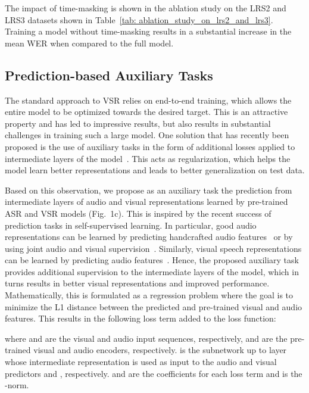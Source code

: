 \documentclass[twocolumn]{article}
\begin{document}
The impact of time-masking is shown in the ablation study on the LRS2 and LRS3 datasets shown in Table~\ref{tab: ablation_study_on_lrs2_and_lrs3}. Training a model without time-masking results in a substantial increase in the mean WER when compared to the full model.

\subsection{Prediction-based Auxiliary Tasks}
The standard approach to VSR relies on end-to-end training, which allows the entire model to be optimized towards the desired target. This is an attractive property and has led to impressive results, but also results in substantial challenges in training such a large model. One solution that has recently been proposed is the use of auxiliary tasks in the form of additional losses applied to intermediate layers of the model~\cite{Liu2021,toshniwal2017multitask,lee2021intermediate}. This acts as regularization, which helps the model learn better representations and leads to better generalization on test data.

Based on this observation, we propose as an auxiliary task the prediction from intermediate layers of audio and visual representations learned by pre-trained ASR and VSR models (Fig.~1c). This is inspired by the recent success of prediction tasks in self-supervised learning. In particular, good audio representations can be learned by predicting handcrafted audio features~\cite{pascual19_interspeech} or by using joint audio and visual supervision~\cite{shukla2020learning}. Similarly, visual speech representations can be learned by predicting audio features~\cite{ma21c_interspeech}. Hence, the proposed auxiliary task provides additional supervision to the intermediate layers of the model, which in turns results in better visual representations and improved performance. Mathematically, this is formulated as a regression problem where the goal is to minimize the L1 distance between the predicted and pre-trained visual and audio features. This results in the following loss term added to the loss function:



where  and  are the visual and audio input sequences, respectively,  and  are the pre-trained visual and audio encoders, respectively.  is the subnetwork up to layer  whose intermediate representation is used as input to the audio and visual predictors  and , respectively.  and  are the coefficients for each loss term and  is the -norm. 
\end{document}
